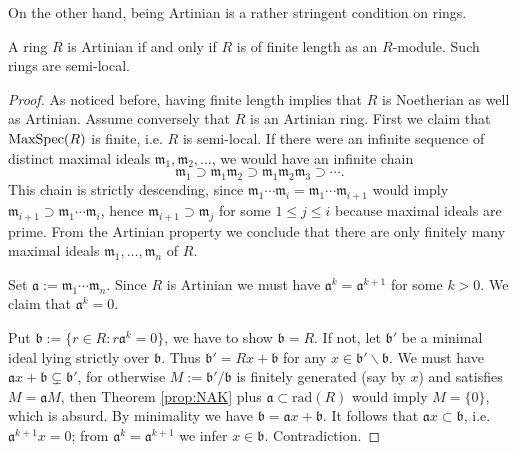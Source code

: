 On the other hand, being Artinian is a rather stringent condition on rings.
\begin{theorem}\label{prop:Artinian-length}
	A ring $R$ is Artinian if and only if $R$ is of finite length as an $R$-module. Such rings are semi-local.
\end{theorem}
\begin{proof}
	As noticed before, having finite length implies that $R$ is Noetherian as well as Artinian. Assume conversely that $R$ is an Artinian ring. First we claim that $\operatorname{MaxSpec}(R)$ is finite, i.e. $R$ is semi-local. If there were an infinite sequence of distinct maximal ideals $\mathfrak{m}_1, \mathfrak{m}_2, \ldots$, we would have an infinite chain
	\[ \mathfrak{m}_1 \supset \mathfrak{m}_1 \mathfrak{m}_2 \supset \mathfrak{m}_1 \mathfrak{m}_2 \mathfrak{m}_3 \supset \cdots. \]
	This chain is strictly descending, since $\mathfrak{m}_1 \cdots \mathfrak{m}_i = \mathfrak{m}_1 \cdots \mathfrak{m}_{i+1}$ would imply $\mathfrak{m}_{i+1} \supset \mathfrak{m}_1 \cdots \mathfrak{m}_i$, hence $\mathfrak{m}_{i+1} \supset \mathfrak{m}_j$ for some $1 \leq j \leq i$ because maximal ideals are prime. From the Artinian property we conclude that there are only finitely many maximal ideals $\mathfrak{m}_1, \ldots, \mathfrak{m}_n$ of $R$.
	
	Set $\mathfrak{a} := \mathfrak{m}_1 \cdots \mathfrak{m}_n$. Since $R$ is Artinian we must have $\mathfrak{a}^k = \mathfrak{a}^{k+1}$ for some $k > 0$. We claim that $\mathfrak{a}^k = 0$.
	
	Put $\mathfrak{b} := \{r \in R: r\mathfrak{a}^k = 0 \}$, we have to show $\mathfrak{b}=R$. If not, let $\mathfrak{b}'$ be a minimal ideal lying strictly over $\mathfrak{b}$. Thus $\mathfrak{b}' = Rx + \mathfrak{b}$ for any $x \in \mathfrak{b}' \smallsetminus \mathfrak{b}$. We must have $\mathfrak{a}x + \mathfrak{b} \subsetneq \mathfrak{b}'$, for otherwise $M := \mathfrak{b}'/\mathfrak{b}$ is finitely generated (say by $x$) and satisfies $M = \mathfrak{a}M$, then Theorem \ref{prop:NAK} plus $\mathfrak{a} \subset \text{rad}(R)$ would imply $M = \{0\}$, which is absurd. By minimality we have $\mathfrak{b} = \mathfrak{a}x + \mathfrak{b}$. It follows that $\mathfrak{a}x \subset \mathfrak{b}$, i.e. $\mathfrak{a}^{k+1} x = 0$; from $\mathfrak{a}^k = \mathfrak{a}^{k+1}$ we infer $x \in \mathfrak{b}$. Contradiction.
	

\end{proof}
